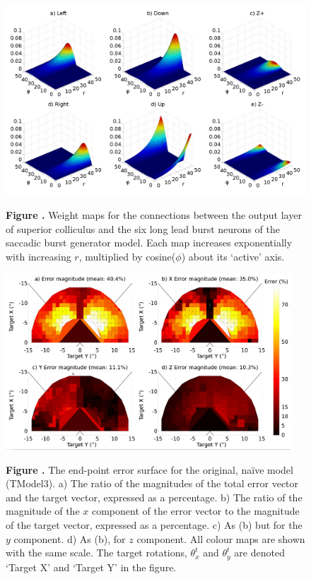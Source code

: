 \documentclass{frontiersSCNS}
\begin{document}
\begin{figure}[htb!]
\begin{center}
\includegraphics[width=\textwidth]{./figures/weightmaps.png}
\end{center}
\textbf{\label{weightmaps} Figure .}
{ Weight maps for the connections between the output layer of superior
colliculus and the six long lead burst neurons of the saccadic burst
generator model. Each map increases exponentially with increasing $r$,
multiplied by cosine($\phi$) about its `active' axis.}
\end{figure}

\begin{figure}[htb!]
\begin{center}
\includegraphics[width=0.95\textwidth]{./figures/errorsurface_TModel3.png}
\end{center}
\textbf{\label{errorsurfaceTM3} Figure .}
{ The end-point error surface for the original, na\"ive model
(TModel3). a) The ratio of the magnitudes of the total error vector
and the target vector, expressed as a percentage. b) The ratio of the
magnitude of the $x$ component of the error vector to the magnitude of
the target vector, expressed as a percentage. c) As (b) but for the
$y$ component. d) As (b), for $z$ component. All colour maps are shown
with the same scale. The target rotations, $\theta_{x}^t$ and
$\theta_{y}^t$ are denoted `Target X' and `Target Y' in the figure.}
\end{figure}
\end{document}
